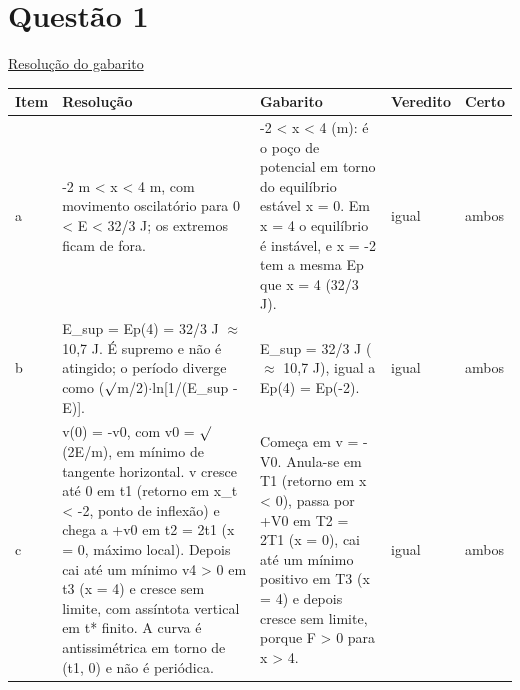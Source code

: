 \documentclass{article}%
\begin{document}
%
\section*{Questão 1}%
\href{https://poliedroresolve.sistemapoliedro.com.br/vestibulares/ime/2026/ime-2-fase-dia-2-24-10-2025-2-fase-dia-2/dissertativa-1-fisica-2-fase-dia-2-ime-2026}{Resolução do gabarito}\par\smallskip%
\begin{longtable}{@{}p{} p{} p{} p{} p{}@{}}\toprule Item & Resolução & Gabarito & Veredito & Certo \\ \midrule
a & {-}2 m < x < 4 m, com movimento oscilatório para 0 < E < 32/3 J; os extremos ficam de fora. & {-}2 < x < 4 (m): é o poço de potencial em torno do equilíbrio estável x = 0. Em x = 4 o equilíbrio é instável, e x = {-}2 tem a mesma Ep que x = 4 (32/3 J). & igual & ambos \\
b & E\_sup = Ep(4) = 32/3 J $\approx$ 10,7 J. É supremo e não é atingido; o período diverge como ($\surd$m/2)$\cdot$ln{[}1/(E\_sup {-} E){]}. & E\_sup = 32/3 J ($\approx$ 10,7 J), igual a Ep(4) = Ep({-}2). & igual & ambos \\
c & v(0) = {-}v0, com v0 = $\surd$(2E/m), em mínimo de tangente horizontal. v cresce até 0 em t1 (retorno em x\_t < {-}2, ponto de inflexão) e chega a +v0 em t2 = 2t1 (x = 0, máximo local). Depois cai até um mínimo v4 > 0 em t3 (x = 4) e cresce sem limite, com assíntota vertical em t* finito. A curva é antissimétrica em torno de (t1, 0) e não é periódica. & Começa em v = {-}V0. Anula{-}se em T1 (retorno em x < 0), passa por +V0 em T2 = 2T1 (x = 0), cai até um mínimo positivo em T3 (x = 4) e depois cresce sem limite, porque F > 0 para x > 4. & igual & ambos \\
\bottomrule\end{longtable}%
\end{document}
